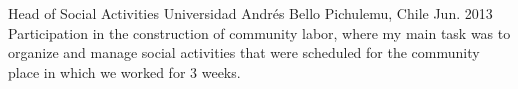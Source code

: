 

\begin{cventries}

  \cventry
    {Head of Social Activities} %
    {Universidad Andrés Bello} %
    {Pichulemu, Chile} %
    {Jun. 2013} %
    {
    	Participation in the construction of community labor, where my main task was to organize and manage social activities that were scheduled for the community place in which we worked for 3 weeks.
    }

\end{cventries}
